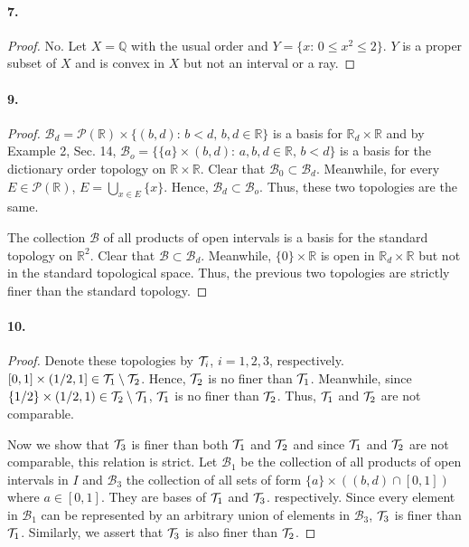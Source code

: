   \paragraph{7.}
  \begin{proof}
    No. Let $X=\mathbb{Q}$ with the usual order and $Y=\{x:\, 0\le x^2\le 2\}$.
    $Y$ is a proper subset of $X$ and is convex in $X$ but not an interval or a
    ray.
  \end{proof}
  
  \paragraph{9.}
  \begin{proof}
    $\mathcal{B}_d=\mathcal{P}(\mathbb{R})\times\{(b,d):\, b<d,\,b,d\in
    \mathbb{R}\}$ is a basis for $\mathbb{R}_d\times\mathbb{R}$ and by Example
    2, Sec. 14, $\mathcal{B}_o=\{\{a\}\times(b,d):\, a,b,d\in\mathbb{R},\,
    b<d\}$ is a basis for the dictionary order topology on $\mathbb{R}\times
    \mathbb{R}$. Clear that $\mathcal{B}_0\subset\mathcal{B}_d$. Meanwhile, for
    every $E\in\mathcal{P}(\mathbb{R})$, $E=\bigcup_{x\in E}\{x\}$. Hence, 
    $\mathcal{B}_d\subset\mathcal{B}_o$. Thus, these two topologies are the 
    same.\par
    The collection $\mathcal{B}$ of all products of open intervals is a basis
    for the standard topology on $\mathbb{R}^2$. Clear that $\mathcal{B}\subset
    \mathcal{B}_d$. Meanwhile, $\{0\}\times\mathbb{R}$ is open in $\mathbb{R}_d
    \times\mathbb{R}$ but not in the standard topological space. Thus, the 
    previous two topologies are strictly finer than the standard topology.
  \end{proof}
  
  \paragraph{10.}
  \begin{proof}
    Denote these topologies by $\mathcal{T}_i$, $i=1,2,3$, respectively. $[0,1]\times
    (1/2,1]\in\mathcal{T}_1\setminus\mathcal{T}_2$. Hence, $\mathcal{T}_2$ is no finer than $\mathcal{T}_1$. 
    Meanwhile, since $\{1/2\}\times(1/2,1)\in\mathcal{T}_2\setminus\mathcal{T}_1$, $\mathcal{T}_1$ is 
    no finer than $\mathcal{T}_2$. Thus, $\mathcal{T}_1$ and $\mathcal{T}_2$ are not comparable.\par
    Now we show that $\mathcal{T}_3$ is finer than both $\mathcal{T}_1$ and $\mathcal{T}_2$ and since
    $\mathcal{T}_1$ and $\mathcal{T}_2$ are not comparable, this relation is strict. Let 
    $\mathcal{B}_1$ be the collection of all products of open intervals in 
    $I$ and $\mathcal{B}_3$ the collection of all sets of form $\{a\}\times
    ((b,d)\cap[0,1])$ where $a\in[0,1]$. They are bases of $\mathcal{T}_1$ and $\mathcal{T}_3$.
    respectively. Since every element in $\mathcal{B}_1$ can be represented by
    an arbitrary union of elements in $\mathcal{B}_3$, $\mathcal{T}_3$ is finer than
    $\mathcal{T}_1$. Similarly, we assert that $\mathcal{T}_3$ is also finer than $\mathcal{T}_2$.
  \end{proof}

